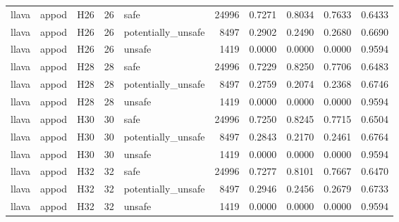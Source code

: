 \begin{table}[tbp]
\begin{tabular}{lllrlrrrrr}
llava & appod & H26 & 26 & safe & 24996 & 0.7271 & 0.8034 & 0.7633 & 0.6433 \\
llava & appod & H26 & 26 & potentially\_unsafe & 8497 & 0.2902 & 0.2490 & 0.2680 & 0.6690 \\
llava & appod & H26 & 26 & unsafe & 1419 & 0.0000 & 0.0000 & 0.0000 & 0.9594 \\
llava & appod & H28 & 28 & safe & 24996 & 0.7229 & 0.8250 & 0.7706 & 0.6483 \\
llava & appod & H28 & 28 & potentially\_unsafe & 8497 & 0.2759 & 0.2074 & 0.2368 & 0.6746 \\
llava & appod & H28 & 28 & unsafe & 1419 & 0.0000 & 0.0000 & 0.0000 & 0.9594 \\
llava & appod & H30 & 30 & safe & 24996 & 0.7250 & 0.8245 & 0.7715 & 0.6504 \\
llava & appod & H30 & 30 & potentially\_unsafe & 8497 & 0.2843 & 0.2170 & 0.2461 & 0.6764 \\
llava & appod & H30 & 30 & unsafe & 1419 & 0.0000 & 0.0000 & 0.0000 & 0.9594 \\
llava & appod & H32 & 32 & safe & 24996 & 0.7277 & 0.8101 & 0.7667 & 0.6470 \\
llava & appod & H32 & 32 & potentially\_unsafe & 8497 & 0.2946 & 0.2456 & 0.2679 & 0.6733 \\
llava & appod & H32 & 32 & unsafe & 1419 & 0.0000 & 0.0000 & 0.0000 & 0.9594 \\
\bottomrule
\end{tabular}
\end{table}
